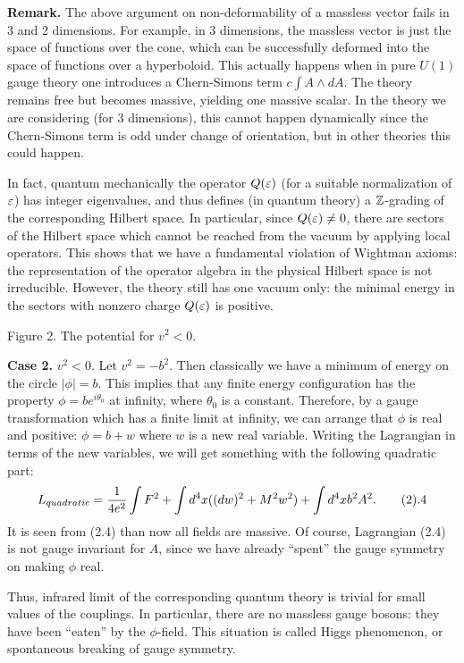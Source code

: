 {\bf Remark.} The above argument on non-deformability of a massless vector
fails in 3 and 2 dimensions. For example, in 3 dimensions, the 
massless vector is just the space of functions over the cone, which 
can be successfully deformed into the space of functions over a hyperboloid. 
This actually happens when in pure $U(1)$ gauge theory one introduces 
a Chern-Simons term $c\int A\wedge dA$. The theory remains free but 
becomes massive, yielding one massive scalar. In the theory we are 
considering (for 3 dimensions), this cannot happen dynamically since 
the Chern-Simons term is odd under change of orientation, but in other 
theories this could happen. 

In fact, quantum mechanically 
the operator $Q(\varepsilon)$ (for a suitable normalization of $\varepsilon$)
has integer eigenvalues, and thus defines (in quantum theory) 
a $\Bbb Z$-grading of the corresponding Hilbert space. In particular, 
since $Q(\varepsilon)\ne 0$, there are sectors of the Hilbert space which 
cannot be reached from the vacuum by applying local operators. 
This shows that we have a fundamental violation of Wightman axioms: 
the representation of the operator algebra in the physical Hilbert space 
is not irreducible. However, the theory still has one vacuum only: 
the minimal energy in the sectors with nonzero charge $Q(\varepsilon)$ is positive.   

\centerline{\epsfxsize=2in}
\centerline{Figure 2. The potential for $v^2<0$.}

\bigskip

{\bf Case 2.} $v^2<0$. Let $v^2=-b^2$. Then classically we have a minimum of 
energy on the circle $|\phi|=b$. This implies 
that any finite energy configuration has the property 
$\phi=be^{i\theta_0}$ at infinity, where $\theta_0$ is a constant. 
Therefore, by a gauge transformation which has a finite limit 
at infinity, we can arrange 
that $\phi$ is real and positive: $\phi=b+w$ where $w$ is a new real 
variable.  
Writing the Lagrangian in terms of the new variables, we will get 
something with the following quadratic part: 
$$
L_{quadratic}=\frac{1}{4e^2}\int F^2+\int d^4x((dw)^2+M^2w^2)+\int d^4xb^2A^2.
\tag 2.4
$$
It is seen from (2.4) than now all fields are massive. Of course, 
Lagrangian (2.4) is not gauge invariant for $A$, since we have already 
``spent'' the gauge symmetry on making $\phi$ real. 

Thus, infrared limit of the corresponding quantum theory is trivial
for small values of the couplings. In particular, there are no massless gauge 
bosons: they have been ``eaten'' by the $\phi$-field. This situation 
is called Higgs phenomenon, or spontaneous breaking of gauge symmetry.  

